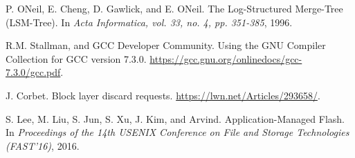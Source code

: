 \begin{thebibliography}{00}
P. ONeil, E. Cheng, D. Gawlick, and E. ONeil.
The Log-Structured Merge-Tree (LSM-Tree).
In \textit{Acta Informatica, vol. 33, no. 4, pp. 351-385}, 1996.

R.M. Stallman, and GCC Developer Community.
Using the GNU Compiler Collection for GCC version 7.3.0.
\url{https://gcc.gnu.org/onlinedocs/gcc-7.3.0/gcc.pdf}.

J. Corbet.
Block layer discard requests.
\url{https://lwn.net/Articles/293658/}.

S. Lee, M. Liu, S. Jun, S. Xu, J. Kim, and Arvind.
Application-Managed Flash.
In \textit{Proceedings of the 14th USENIX Conference on File and Storage
Technologies (FAST'16)}, 2016.

\end{thebibliography}
